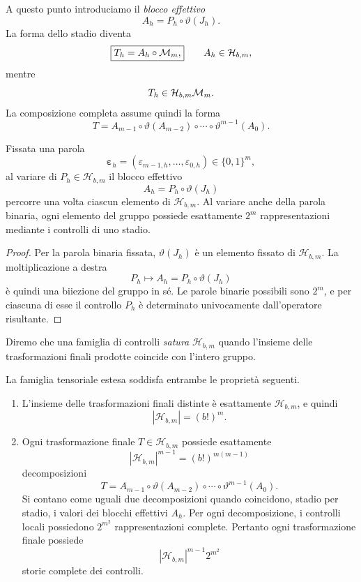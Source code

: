 	A questo punto introduciamo il \emph{blocco effettivo}
	\[
	\boxed{
	A_h
	=
	P_h\circ\vartheta(J_h).
	}
	\]
	La forma dello stadio diventa
	\[
	\boxed{
	T_h=A_h\circ\mathcal M_m,
	}
	\qquad
	A_h\in\mathcal H_{b,m},
	\]
	mentre
	\[
	T_h\in\mathcal H_{b,m}\mathcal M_m.
	\]
	La composizione completa assume quindi la forma
	\[
	\boxed{
	T
	=
	A_{m-1}
	\circ\vartheta(A_{m-2})
	\circ\cdots\circ
	\vartheta^{m-1}(A_0).
	}
	\]

	\begin{proposition}
		Fissata una parola
		\[
		\boldsymbol{\varepsilon}_h
		=
		(\varepsilon_{m-1,h},\dots,\varepsilon_{0,h})
		\in\{0,1\}^m,
		\]
		al variare di \(P_h\in\mathcal H_{b,m}\) il blocco effettivo
		\[
		A_h=P_h\circ\vartheta(J_h)
		\]
		percorre una volta ciascun elemento di
		\(\mathcal H_{b,m}\). Al variare anche della parola binaria, ogni
		elemento del gruppo possiede esattamente \(2^m\) rappresentazioni
		mediante i controlli di uno stadio.
	\end{proposition}

	\begin{proof}
		Per la parola binaria fissata, \(\vartheta(J_h)\) è un elemento fissato
		di \(\mathcal H_{b,m}\). La moltiplicazione a destra
		\[
		P_h
		\longmapsto
		A_h=P_h\circ\vartheta(J_h)
		\]
		è quindi una biiezione del gruppo in sé. Le parole binarie possibili
		sono \(2^m\), e per ciascuna di esse il controllo \(P_h\) è determinato
		univocamente dall'operatore risultante.
	\end{proof}

	Diremo che una famiglia di controlli \emph{satura}
	\(\mathcal H_{b,m}\) quando l'insieme delle trasformazioni finali prodotte
	coincide con l'intero gruppo.

	\begin{theorem}\label{thm:saturazione-uniformita-estesa}
		La famiglia tensoriale estesa soddisfa entrambe le proprietà seguenti.
		\begin{enumerate}
			\item L'insieme delle trasformazioni finali distinte è esattamente
			\(\mathcal H_{b,m}\), e quindi
			\[
			|\mathcal H_{b,m}|=(b!)^m.
			\]

			\item Ogni trasformazione finale \(T\in\mathcal H_{b,m}\) possiede
			esattamente
			\[
			|\mathcal H_{b,m}|^{m-1}
			=
			(b!)^{m(m-1)}
			\]
			decomposizioni
			\[
			T
			=
			A_{m-1}\circ\vartheta(A_{m-2})
			\circ\cdots\circ\vartheta^{m-1}(A_0).
			\]
			Si contano come uguali due decomposizioni quando coincidono, stadio per
			stadio, i valori dei blocchi effettivi \(A_h\). Per ogni decomposizione,
			i controlli locali possiedono \(2^{m^2}\) rappresentazioni complete.
			Pertanto ogni trasformazione finale possiede
			\[
			|\mathcal H_{b,m}|^{m-1}2^{m^2}
			\]
			storie complete dei controlli.
		\end{enumerate}
	\end{theorem}

